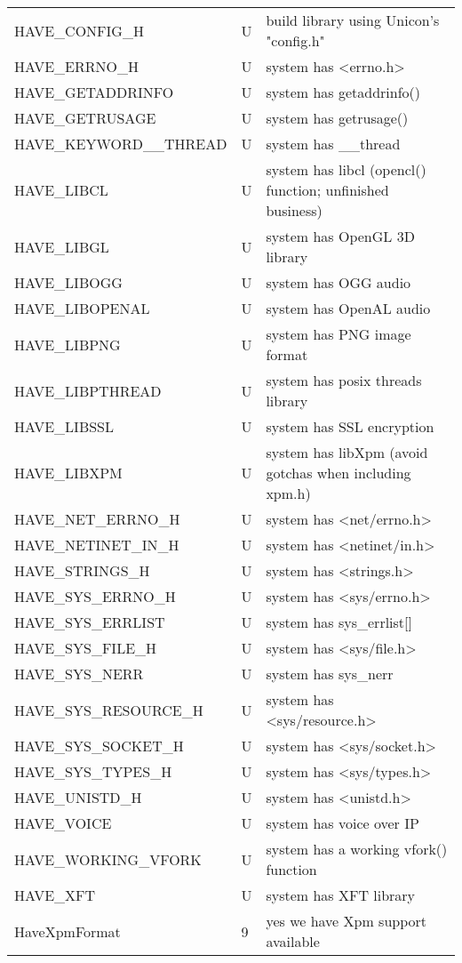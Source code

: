 \begin{xtabular}{|m{1.8in}|m{0.5in}|m{4.0in}|}
HAVE\_CONFIG\_H & U & build library using Unicon's "config.h" \\
HAVE\_ERRNO\_H & U & system has <errno.h> \\
HAVE\_GETADDRINFO & U & system has getaddrinfo() \\
HAVE\_GETRUSAGE & U & system has getrusage() \\
HAVE\_KEYWORD\_\_THREAD & U & system has \_\_thread \\
HAVE\_LIBCL & U & system has libcl (opencl() function; unfinished business) \\
HAVE\_LIBGL & U & system has OpenGL 3D library \\
HAVE\_LIBOGG & U & system has OGG audio \\
HAVE\_LIBOPENAL & U & system has OpenAL audio \\
HAVE\_LIBPNG & U & system has PNG image format \\
HAVE\_LIBPTHREAD & U & system has posix threads library \\
HAVE\_LIBSSL & U & system has SSL encryption \\
HAVE\_LIBXPM & U & system has libXpm (avoid gotchas when including xpm.h) \\
HAVE\_NET\_ERRNO\_H & U & system has <net/errno.h> \\
HAVE\_NETINET\_IN\_H & U & system has <netinet/in.h> \\
HAVE\_STRINGS\_H & U & system has <strings.h> \\
HAVE\_SYS\_ERRNO\_H & U & system has <sys/errno.h> \\
HAVE\_SYS\_ERRLIST & U & system has sys\_errlist[] \\
HAVE\_SYS\_FILE\_H & U & system has <sys/file.h> \\
HAVE\_SYS\_NERR & U & system has sys\_nerr \\
HAVE\_SYS\_RESOURCE\_H & U & system has <sys/resource.h> \\
HAVE\_SYS\_SOCKET\_H & U & system has <sys/socket.h> \\
HAVE\_SYS\_TYPES\_H & U & system has <sys/types.h> \\
HAVE\_UNISTD\_H & U & system has <unistd.h> \\
HAVE\_VOICE & U & system has voice over IP \\
HAVE\_WORKING\_VFORK & U & system has a working vfork() function \\
HAVE\_XFT & U & system has XFT library \\
HaveXpmFormat & 9 & yes we have Xpm support available \\

\end{xtabular}

